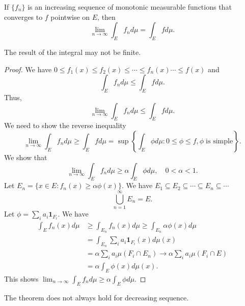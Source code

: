 \documentclass[class=book, crop=false]{standalone}
\begin{document}
        \begin{theorem}
            If $\{f_n\}$ is an increasing sequence of monotonic measurable functions that converges to $f$ pointwise on $E$, then
            \begin{equation*}
                \lim_{n \rightarrow \infty} \int_E f_n d\mu = \int_E f d\mu.
            \end{equation*}
        \end{theorem}
        \begin{remark}
            The result of the integral may not be finite.
        \end{remark}
        \begin{proof}
            We have $0 \leq f_1(x) \leq f_2(x) \leq \cdots \leq f_n(x) \cdots \leq f(x)$ and
            \begin{equation*}
                \int_E f_n d\mu \leq \int_E f d\mu.
            \end{equation*}
            Thus,
            \begin{equation*}
                \lim_{n \rightarrow \infty} \int_E f_n d\mu \leq \int_E f d\mu.
            \end{equation*}
            We need to show the reverse inequality
            \begin{equation*}
                \lim_{n \rightarrow \infty} \int_E f_n d\mu \geq \int_E f d\mu = \sup\left\{\int_E \phi d\mu : 0 \leq \phi \leq f, \phi \;\text{is simple}\right\}.
            \end{equation*}
            We show that
            \begin{equation*}
                \lim_{n \rightarrow \infty} \int_E f_n d\mu \geq \alpha \int_E \phi d\mu, \quad 0 < \alpha < 1.
            \end{equation*}
            Let $E_n = \{x \in E : f_n(x) \geq \alpha \phi(x)\}$. We have $E_1 \subseteq E_2 \subseteq \cdots \subseteq E_n \subseteq \cdots$
            \begin{equation*}
                \bigcup^{\infty}_{n = 1} E_n = E.
            \end{equation*}
            Let $\phi = \sum_{i} a_i \mathbf{1}_{F_i}$. We have
            \begin{align*}
                \int_E f_n(x) d\mu &\geq \int_{E_n} f_n(x) d\mu \geq \int_{E_n} \alpha \phi(x) d\mu \\
                &= \int_{E_n} \sum_{i} a_i \mathbf{1}_{F_i}(x) d\mu(x) \\
                &= \alpha\sum_{i} a_i \mu(F_i \cap E_n) \rightarrow \alpha \sum_{i} a_i \mu(F_i \cap E) \\
                &= \alpha \int_E \phi(x) d\mu(x).
            \end{align*}
            This shows $\lim_{n \rightarrow \infty} \int_E f_n d\mu \geq \alpha \int_E \phi d\mu$.
        \end{proof}
        \begin{remark}
            The theorem does not always hold for decreasing sequence.
        \end{remark}
\end{document}
